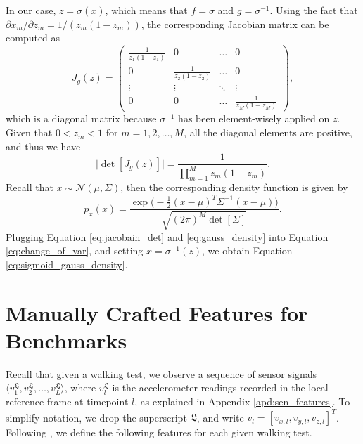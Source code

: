 \begin{appendices}
In our case, $z=\sigma(x)$, which means that $f=\sigma$ and $g=\sigma^{-1}$. Using the fact that $\partial x_m/\partial z_m = 1 / (z_m(1-z_m))$, the corresponding Jacobian matrix can be computed as
\begin{equation}
J_{g}(z) =  \begin{pmatrix}
    \frac{1}{z_1 (1-z_1)} & 0 & \dots & 0 \\
    0 & \frac{1}{z_2 (1-z_2)} & \dots & 0 \\
    \vdots & \vdots & \ddots & \vdots \\
    0 & 0 & \dots & \frac{1}{z_M (1-z_M)}
    \end{pmatrix},
\end{equation}
which is a diagonal matrix because $\sigma^{-1}$ has been element-wisely applied on $z$. Given that $0< z_m < 1$ for $m=1,2,\dots,M$, all the diagonal elements are positive, and thus we have 
\begin{equation}
\label{eq:jacobain_det}
    \big| \det[J_g(z)] \big|  = \frac{1}{\prod_{m=1}^{M} z_{m}(1-z_{m})}.
\end{equation}
Recall that $x \sim \mathcal{N}(\mu, \Sigma)$, then the corresponding density function is given by 
\begin{equation}
\label{eq:gauss_density}
p_x(x) = \frac {\exp \big(-\frac{1}{2}(x-\mu)^{T}{\Sigma}^{-1}(x-\mu) \big)}{ \sqrt{(2 \pi)^{M} \det[\Sigma] }}.
\end{equation}
Plugging Equation \ref{eq:jacobain_det} and \ref{eq:gauss_density} into Equation \ref{eq:change_of_var}, and setting $x=\sigma^{-1}(z)$, we obtain Equation \ref{eq:sigmoid_gauss_density}.

\clearpage

\section{Manually Crafted Features for Benchmarks}\label{apd:mannual_features}

Recall that given a walking test, we observe a sequence of sensor signals $\langle v_1^{\mathfrak{L}}, v_2^{\mathfrak{L}}, \dots, v_L^{\mathfrak{L}} \rangle$, where $v_l^{\mathfrak{L}}$ is the accelerometer readings recorded in the local reference frame at timepoint $l$, as explained in Appendix \ref{apd:sen_features}. To simplify notation, we drop the superscript $\mathfrak{L}$, and write $v_l=[v_{x,l},v_{y,l},v_{z,l}]^T$.
Following \cite{yu_wearable_2022_a}, we define the following features for each given walking test. 


\end{appendices}
